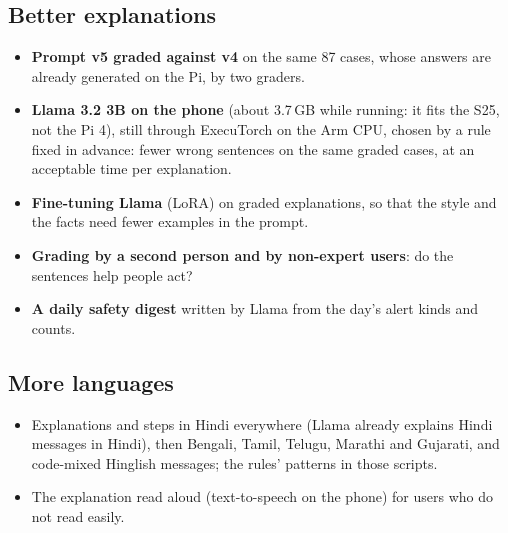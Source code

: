 \documentclass[11pt,a4paper]{article}
\begin{document}
\subsection{Better explanations}
\begin{itemize}
  \item \textbf{Prompt v5 graded against v4} on the same 87 cases, whose answers are already generated on the Pi, by two
        graders.
  \item \textbf{Llama 3.2 3B on the phone} (about 3.7\,GB while running: it fits the S25, not the Pi 4), still through
        ExecuTorch on the Arm CPU, chosen by a rule fixed in advance: fewer wrong sentences on the same graded cases, at an
        acceptable time per explanation.
  \item \textbf{Fine-tuning Llama} (LoRA) on graded explanations, so that the style and the facts need fewer examples
        in the prompt.
  \item \textbf{Grading by a second person and by non-expert users}: do the sentences help people act?
  \item \textbf{A daily safety digest} written by Llama from the day's alert kinds and counts.
\end{itemize}

\subsection{More languages}
\begin{itemize}
  \item Explanations and steps in Hindi everywhere (Llama already explains Hindi messages in Hindi), then Bengali,
        Tamil, Telugu, Marathi and Gujarati, and code-mixed Hinglish messages; the rules' patterns in those scripts.
  \item The explanation read aloud (text-to-speech on the phone) for users who do not read easily.
\end{itemize}
\end{document}

